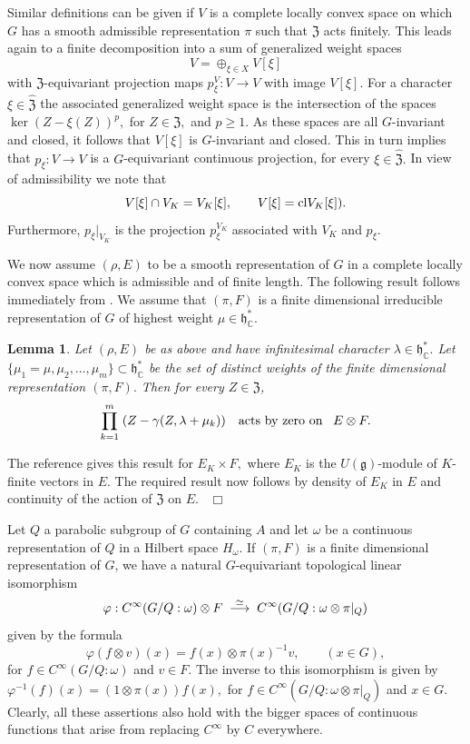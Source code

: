 \documentclass[12pt,a4paper]{article}
\newtheorem{Lemma}[Thm]{Lemma}
\newenvironment{lemma}[0]{\begin{Lemma}\noindent}%
{\end{Lemma}}
\def\proof{\par\noindent{\it Proof.}{\ }{\ }}
\def\qed{~\hfill\hbox{$\Box$}\medbreak}
\def\qquad{\quad\quad}
\def\msy#1{{\mathbb #1}}
\def\C{{\msy C}}
\def\gf{\varphi}
\def\gg{\gamma}
\def\gl{\lambda}
\def\got#1{\mathfrak #1}
\def\fg{{\got g}}
\def\fh{{\got h}}
\def\to{\rightarrow}
\def\iC{{\scriptscriptstyle \C}}
\numberwithin{Thm}{section}
\numberwithin{equation}{section}
\def\fZ{{\mathfrak Z}}
\def\fhdc{\fh_\iC^*}
\numberwithin{equation}{section}
\def\cl{{\rm cl}}
\def\fZ{{\mathfrak Z}}
\def\fhdc{\fh_\iC^*}
\def\fh{{\mathfrak h}}
\begin{document}
Similar definitions can be given if $V$ is a complete locally convex space on 
which $G$ has a smooth admissible representation $\pi$ such that $\fZ$ acts finitely. 
This leads again to a finite decomposition into a sum of generalized weight spaces 
$$
V = \oplus_{\xi \in X} V[\xi]
$$
with $\fZ$-equivariant projection maps $p^V_\xi: V \to V$ with image $V[\xi].$ 
For a character 
$\xi \in \widehat \fZ$ the associated generalized weight space is the intersection
of the spaces $\ker (Z -\xi(Z))^p,$ for $Z \in \fZ,$ and $p\geq 1.$ As these spaces are all
$G$-invariant and closed, it follows that $V[\xi]$ is $G$-invariant and closed. This in turn implies that $p_\xi: V \to V$ is a $G$-equivariant continuous projection, for every $\xi \in \widehat \fZ.$ 
In view of admissibility we note that
$$ 
V[\xi] \cap V_K = V_K[\xi], \qquad V[\xi ]= \cl V_K[\xi]).
$$ 
Furthermore, $p_\xi|_{V_K}$ is the projection $p^{V_K}_\xi$ associated with $V_K$ 
and $p_\xi.$

%
We now assume  $(\rho, E)$ to be a smooth 
representation of $G$ in a complete locally convex space which is admissible and of finite length. 
The following result follows immediately from \cite[Thm.~5.1]{Ktensprod}.  
We assume that $(\pi, F)$ is a finite dimensional irreducible representation of $G$
of highest weight $\mu\in \fhdc$. 
%

\begin{lemma}
\label{l: action by Z on tensor prod}
Let $(\rho, E)$ be as above and have infinitesimal character $\gl\in \fhdc.$ 
Let $\{\mu_1 = \mu, \mu_2,\dots, \mu_m\} \subset \fhdc$ be 
the set of distinct weights of the finite dimensional representation $(\pi, F).$ 
Then for every $Z \in \fZ$, 
$$ 
\prod_{k =1}^m  \;(Z - \gg(Z, \gl + \mu_k)) \quad \mbox{\rm acts by zero on}\;\;\; E \otimes F.
$$ 
\end{lemma}
\proof 
The reference \cite[Thm.~5.1]{Ktensprod} gives this result for $E_K \times F,$ where
$E_K$ is the $U(\fg)$-module of $K$-finite vectors in $E.$ The required result now follows
by density of $E_K$ in $E$ and continuity of the action of $\fZ$ on $E.$ 
\qed

Let $Q$ a parabolic subgroup of  $G$ containing $A$ and let $\omega$ be a 
continuous representation of $Q$ in a Hilbert space $H_\omega.$ 
If $(\pi, F)$ is a finite dimensional representation of $G$, we have a natural $G$-equivariant topological linear isomorphism
\begin{equation}
\label{e: natural iso gf smooth}
\gf:  C^\infty(G/Q: \omega) \otimes F \;\;{\buildrel \simeq\over \longrightarrow} \;\;C^\infty(G/Q: \omega \otimes \pi|_Q)
\end{equation}
given by the formula 
$$ 
\gf(f \otimes v) (x) = f(x) \otimes \pi(x)^{-1} v, \qquad (x \in G),
$$ 
for $f \in C^\infty(G/Q: \omega)$ and $v \in F.$  The inverse to this isomorphism
is given by $\gf^{-1}(f)(x) = (1 \otimes \pi(x)) f(x),$ for $f \in C^\infty(G/Q: \omega \otimes \pi|_Q)$ 
and $x \in G.$ Clearly, all these assertions also hold with the bigger spaces of continuous functions that arise from replacing $C^\infty$ by $C$ everywhere.
\end{document}

